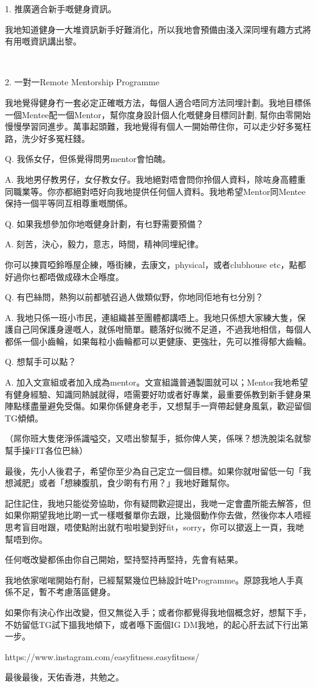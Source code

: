 1. 推廣適合新手嘅健身資訊。

我地知道健身一大堆資訊新手好難消化，所以我地會預備由淺入深同埋有趣方式將有用嘅資訊講出黎。

⠀⠀⠀⠀⠀⠀⠀⠀

2. 一對一Remote Mentorship Programme

我地覺得健身冇一套必定正確嘅方法，每個人適合唔同方法同埋計劃。我地目標係一個Mentee配一個Mentor，幫你度身設計個人化嘅健身目標同計劃, 幫你由零開始慢慢學習同進步。萬事起頭難，我地覺得有個人一開始帶住你，可以走少好多冤枉路，洗少好多冤枉錢。

Q. 我係女仔，但係覺得問男mentor會怕醜。

A. 我地男仔教男仔，女仔教女仔。我地絕對唔會問你拎個人資料，除咗身高體重同職業等。你亦都絕對唔好向我地提供任何個人資料。我地希望Mentor同Mentee保持一個平等同互相尊重嘅關係。

Q. 如果我想參加你地嘅健身計劃，有乜野需要預備？

A. 刻苦，決心，毅力，意志，時間，精神同埋紀律。

你可以揀買啞鈴喺屋企練，喺街練，去康文，physical，或者clubhouse etc，點都好過你乜都唔做成碌木企喺度。

Q. 有巴絲問，熱狗以前都號召過人做類似野，你地同佢地有乜分別？

A. 我地只係一班小市民，連組織甚至團體都講唔上。我地只係想大家練大隻，保護自己同保護身邊嘅人，就係咁簡單。聽落好似微不足道，不過我地相信，每個人都係一個小齒輪，如果每粒小齒輪都可以更健康、更強壯，先可以推得郁大齒輪。

Q. 想幫手可以點？

A. 加入文宣組或者加入成為mentor。文宣組識普通製圖就可以；Mentor我地希望有健身經驗、知識同熱誠就得，唔需要好叻或者好專業，最重要係教到新手健身果陣點樣盡量避免受傷。如果你係健身老手，又想幫手一齊帶起健身風氣，歡迎留個TG傾傾。

（屌你班大隻佬淨係識嗌交，又唔出黎幫手，抵你俾人笑，係咪？想洗脫柒名就黎幫手操FIT各位巴絲）

最後，先小人後君子，希望你至少為自己定立一個目標。如果你就咁留低一句「我想減肥」或者「想練腹肌，食少啲有冇用？」我地好難幫你。

記住記住，我地只能從旁協助，你有疑問歡迎提出，我哋一定會盡所能去解答，但如果你期望我地比啲一式一樣嘅餐單你去跟，比幾個動作你去做，然後你本人唔經思考盲目咁跟，唔使點附出就冇啦啦變到好fit，sorry，你可以撳返上一頁，我哋幫唔到你。

任何嘅改變都係由你自己開始，堅持堅持再堅持，先會有結果。

我地依家啱啱開始冇耐，已經幫緊幾位巴絲設計咗Programme。原諒我地人手真係不足，暫不考慮落區健身。

如果你有決心作出改變，但又無從入手；或者你都覺得我地個概念好，想幫下手，不妨留低TG試下搵我地傾下，或者喺下面個IG DM我地，的起心肝去試下行出第一步。

https://www.instagram.com/easyfitness.easyfitness/

最後最後，天佑香港，共勉之。


